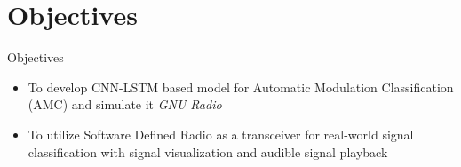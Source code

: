 \section{Objectives}
\begin{frame}[c]{Objectives}
    \begin{itemize}
        \item To develop CNN-LSTM based model for Automatic Modulation Classification (AMC) and simulate it \textit{GNU Radio}
        \\[2em]
        \item  To utilize Software Defined Radio as a transceiver for real-world signal classification with signal visualization and audible signal playback
    \end{itemize}   
\end{frame}